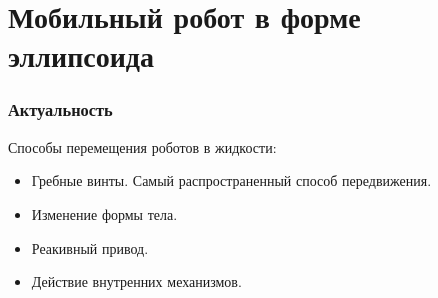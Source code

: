 

\section{Мобильный робот в форме эллипсоида}
\small


\begin{frame}
\frametitle{Актуальность}
	Способы перемещения роботов в жидкости:
	\begin{itemize}
		\item Гребные винты. Самый распространенный способ передвижения.
		\item Изменение формы тела. 
		\item Реакивный привод.
		\item Действие внутренних механизмов.		
	\end{itemize}	

	\begin{minipage}[t]{0.47\linewidth}
	\end{minipage}
	\hfill
	\begin{minipage}[t]{0.47\linewidth}
	\end{minipage}	
	\vspace{3mm}
	
	\begin{minipage}[t]{0.47\linewidth}
	\end{minipage}
	\hfill
	\begin{minipage}[t]{0.47\linewidth}
	\end{minipage}

\end{frame}	
	

